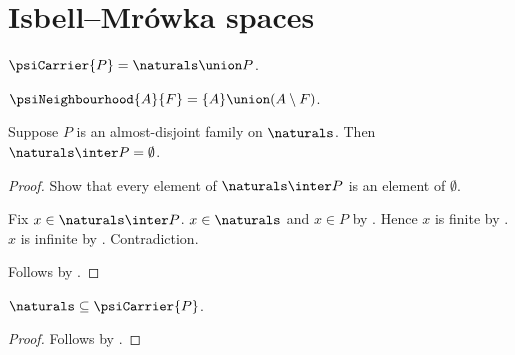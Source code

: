 \section{Isbell--Mrówka spaces}






























\begin{definition}\label{psi_carrier}
    $\psiCarrier{P}=\naturals\union P$.
\end{definition}

\begin{definition}\label{psi_neighbourhood}
    $\psiNeighbourhood{A}{F}=\{A\}\union(A\setminus F)$.
\end{definition}

\begin{proposition}\label{psi_carrier_naturals_disjoint_family}
    Suppose $P$ is an almost-disjoint family on
        $\naturals$.
    Then $\naturals\inter P=\emptyset$.
\end{proposition}
\begin{proof}
    Show that every element of $\naturals\inter P$ is an element
        of $\emptyset$.
    \begin{subproof}
        Fix $x\in\naturals\inter P$.
        $x\in\naturals$ and $x\in P$ by .
        Hence $x$ is finite by .
        $x$ is infinite by
            .
        Contradiction.
    \end{subproof}
    Follows by .
\end{proof}

\begin{proposition}\label{naturals_subset_psi_carrier}
    $\naturals\subseteq\psiCarrier{P}$.
\end{proposition}
\begin{proof}
    Follows by .
\end{proof}

